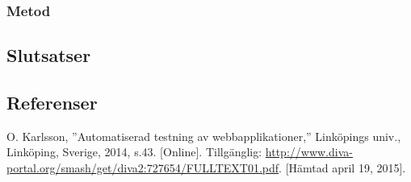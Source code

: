 \subsubsection{Metod}
\subsection{Slutsatser}
\subsection{Referenser}
\begin{thebibliography}{9}

O. Karlsson, ''Automatiserad testning av webbapplikationer,''
Linköpings univ., Linköping, Sverige, 2014, s.43.
[Online]. 
Tillgänglig: 
\url{http://www.diva-portal.org/smash/get/diva2:727654/FULLTEXT01.pdf}.
[Hämtad april 19, 2015].

\end{thebibliography}
